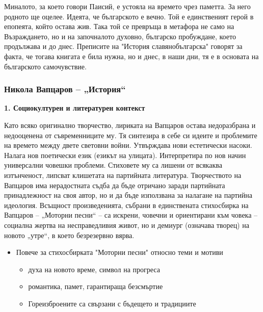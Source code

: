 \documentclass[12pt,a4paper]{article}
\begin{document}
\indent Миналото, за което говори Паисий, е устояла на времето чрез паметта. За него родното ще оцелее. Идеята, че българското е вечно. Той е единственият герой в епопеята, който остава жив. Така той се превръща в метафора не само на Възраждането, но и на започналото духовно, българско пробуждане, което продължава и до днес. Преписите на  "История славянобългарска" говорят за факта, че тогава книгата е била нужна, но и днес, в наши дни, тя е в основата на българското самочувствие.
\newpage

\subsubsection{\colorbox{green!40}{Никола Вапцаров – „История“}}
\textbf{1. Социокултурен и литературен контекст}
\vspace{0.1cm}
 
\indent Като всяко оригинално творчество, лириката на Вапцаров остава недоразбрана и недооценена от съвременниците му. Тя синтезира в себе си идеите и проблемите на времето между двете световни войни. Утвърждава нови естетически насоки. Налага нов поетически език (езикът на улицата). Интерпретира по нов начин универсални човешки проблеми. Стиховете му са лишени от всякаква изтънченост, липсват клишетата на партийната литература. Творчеството на Вапцаров има нерадостната съдба да бъде отричано заради партийната принадлежност на своя автор, но и да бъде използвана за налагане на партийна идеология. Всъщност произведенията, събрани в единствената стихосбирка на Вапцаров – „Моторни песни“ – са искрени, човечни и ориентирани към човека – социална жертва на несправедливия живот, но и демиург (означава творец) на новото „утре“, в което безрезервно вярва. 

\begin{itemize}[leftmargin=*, noitemsep, topsep=2pt, parsep=0pt]
    \item Повече за стихосбирката "Моторни песни" относно теми и мотиви
    \begin{itemize}[leftmargin=*]
        \item духа на новото време, символ на прогреса
        \item романтика, памет, гарантираща безсмъртие
        \item Гореизброените са свързани с бъдещето и традициите
    \end{itemize}
\end{itemize}
\end{document}
